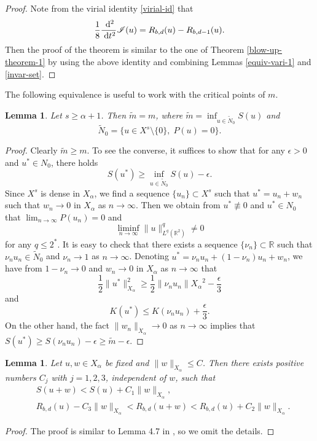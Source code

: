 \documentclass[10pt]{article}
\numberwithin{equation}{section}
\newtheorem{lemma}[theorem]{\quad Lemma}
\newcommand{\nii}{\mathscr{I}}
\newcommand{\dd}{\;{\rm d}}
\newcommand{\x}{{X_\alpha}}
\newcommand{\al}{\alpha}
\newcommand{\rr}{\mathbb{R}}
\newcommand{\rt}{{\mathbb{R}^2}}
\newcommand{\rrr}{{R_{b,d}}}
\begin{document}
	\begin{proof}
		Note from  the virial identity \eqref{virial-id} that
		\begin{equation}\label{virial-m}
			\frac{1}{8}\frac{\dd^2}{\dd t^2}\nii (u)
			=\rrr(u)-R_{b,d-1}(u).
		\end{equation} 
		Then the proof of the theorem is similar to the one of Theorem \ref{blow-up-theorem-1} by using the above identity and combining Lemmas \ref{equiv-vari-1} and \ref{invar-set}.
	\end{proof}
	
	The following equivalence is useful to work with the critical points of $m$.
	\begin{lemma}\label{euqiv-2}
		Let $s\geq\al+1$. Then $\tilde m=m$, where $\tilde m=\inf_{u\in\tilde N_0}S(u)$ and 
		\[
		\tilde N_0=\{u\in X^s\setminus\{0\},\;P(u)=0 \}.
		\]
	\end{lemma}
	\begin{proof}
		Clearly $\tilde m\geq m$. To see the converse, it suffices to show that for any $\epsilon>0$ and $u^\ast\in N_0$, there holds
		\[
		S(u^\ast)\geq \inf_{u\in\tilde N_0}S(u)-\epsilon.
		\]
		Since $X^s$ is dense in $\x$, we find a sequence $\{u_n\}\subset X^s$ such that $u^\ast=u_n+w_n$ such that $w_n\to0$ in $\x$ as $n\to\infty$. Then we obtain from $u^\ast\not\equiv0$  and $u^\ast\in N_0$  that $\lim_{n\to\infty}P(u_n)=0$ and 
		\[
		\liminf_{n\to\infty}\|u\|_{L^q(\rt)}^q\neq0
		\]
		for any $q\leq 2^\ast$. It is easy to check that there exists a sequence $\{\nu_n\}\subset\rr$ such that $\nu_n u_n\in\tilde N_0$ and $\nu_n\to1$ as $n\to\infty$. Denoting $u^\ast=\nu_nu_n+(1-\nu_n)u_n+w_n$, we have from $1-\nu_n\to0$ and $w_n\to0$ in $\x$ as $n\to\infty$ that
		\[
		\frac12\|u^\ast\|_\x^2\geq\frac12\|\nu_nu_n\|\x^2-\frac{\epsilon}{3}
		\]
		and
		\[
		K(u^\ast)\leq K(\nu_nu_n)+\frac{\epsilon}{3}.
		\]
		On the other hand, the fact $\|w_n\|_{\dot X_\al}\to0$ as $n\to\infty$ implies that $S(u^\ast)\geq S(\nu_nu_n)-\epsilon\geq\tilde m-\epsilon$.
	\end{proof}
	\begin{lemma}\label{initial}
		Let $u,w\in\x$ be fixed and $\|w\|_\x\leq C$. Then there exists positive numbers $C_j$ with $j=1,2,3$, independent of $w$, such that
		\[
		\begin{split}
			&	S(u+w)<S(u)+C_1\|w\|_\x,\\
			&	\rrr(u)-C_3\|w\|_\x<\rrr(u+w)<\rrr(u)+C_2\|w\|_\x.
		\end{split}
		\]
	\end{lemma}
	\begin{proof}
		The proof is similar to Lemma 4.7 in \cite{nonlinearity}, so we omit the details.
	\end{proof}
	
\end{document}
